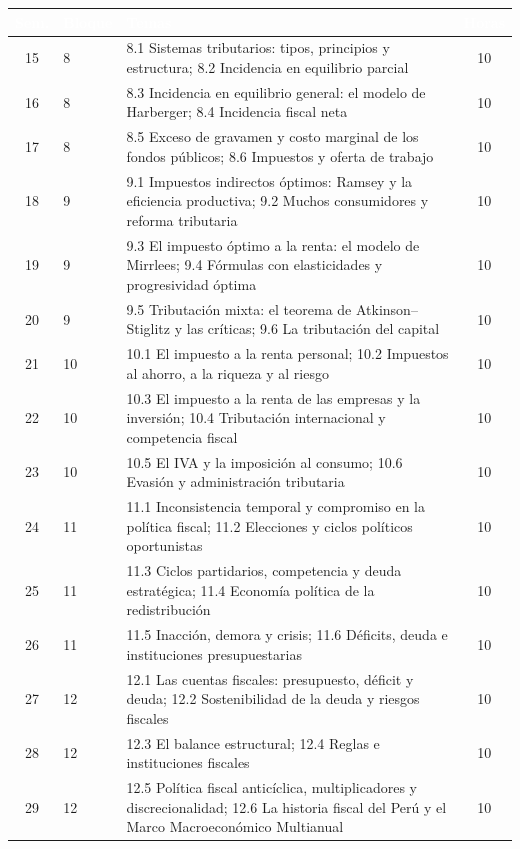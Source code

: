 \documentclass[11pt,a4paper]{article}
\renewcommand{\arraystretch}{1.3}
\newcommand{\cab}[1]{\textcolor{white}{\sffamily\bfseries #1}}
\newcommand{\filasalternas}{\rowcolors{2}{white}{tonoPalido}}
\begin{document}
\newpage
{\small\filasalternas
\renewcommand{\arraystretch}{1.1}\noindent\begin{tabularx}{\textwidth}{clXc}
\toprule
\rowcolor{tonoOscuro}\cab{Sem.} & \cab{Bloque} & \cab{Temas} & \cab{Horas} \\
\midrule
15 & 8 & 8.1 Sistemas tributarios: tipos, principios y estructura; 8.2 Incidencia en equilibrio parcial & 10 \\
16 & 8 & 8.3 Incidencia en equilibrio general: el modelo de Harberger; 8.4 Incidencia fiscal neta & 10 \\
17 & 8 & 8.5 Exceso de gravamen y costo marginal de los fondos públicos; 8.6 Impuestos y oferta de trabajo & 10 \\
\midrule
18 & 9 & 9.1 Impuestos indirectos óptimos: Ramsey y la eficiencia productiva; 9.2 Muchos consumidores y reforma tributaria & 10 \\
19 & 9 & 9.3 El impuesto óptimo a la renta: el modelo de Mirrlees; 9.4 Fórmulas con elasticidades y progresividad óptima & 10 \\
20 & 9 & 9.5 Tributación mixta: el teorema de Atkinson--Stiglitz y las críticas; 9.6 La tributación del capital & 10 \\
\midrule
21 & 10 & 10.1 El impuesto a la renta personal; 10.2 Impuestos al ahorro, a la riqueza y al riesgo & 10 \\
22 & 10 & 10.3 El impuesto a la renta de las empresas y la inversión; 10.4 Tributación internacional y competencia fiscal & 10 \\
23 & 10 & 10.5 El IVA y la imposición al consumo; 10.6 Evasión y administración tributaria & 10 \\
\midrule
24 & 11 & 11.1 Inconsistencia temporal y compromiso en la política fiscal; 11.2 Elecciones y ciclos políticos oportunistas & 10 \\
25 & 11 & 11.3 Ciclos partidarios, competencia y deuda estratégica; 11.4 Economía política de la redistribución & 10 \\
26 & 11 & 11.5 Inacción, demora y crisis; 11.6 Déficits, deuda e instituciones presupuestarias & 10 \\
\midrule
27 & 12 & 12.1 Las cuentas fiscales: presupuesto, déficit y deuda; 12.2 Sostenibilidad de la deuda y riesgos fiscales & 10 \\
28 & 12 & 12.3 El balance estructural; 12.4 Reglas e instituciones fiscales & 10 \\
29 & 12 & 12.5 Política fiscal anticíclica, multiplicadores y discrecionalidad; 12.6 La historia fiscal del Perú y el Marco Macroeconómico Multianual & 10 \\

\end{tabularx}}
\end{document}
